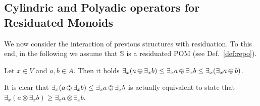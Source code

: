 \documentclass{llncs}
\def\monop{\otimes}
\def\odiv{\, {\ominus\hspace{-7.7pt} \div} \,}
\begin{document}


\subsection{Cylindric and Polyadic operators for Residuated Monoids}
\label{cyre}
We now consider 
the interaction of previous structures with residuation. 
%
To this end, in the following we assume that 
$\mathbb{S}$ is a residuated POM (see Def.~\ref{def:repo}).


\begin{lemma}
\label{divex}
Let $x \in V$ and $a, b \in A$.
Then it holds
         $\exists_x(a \odiv \exists_x b) \leq \exists_x a \odiv \exists_x b \leq
                                               \exists_x(\exists_x a \odiv b)$.
\end{lemma}



\begin{remark}
\label{remdiv}
It is clear that $\exists_x(a \odiv \exists_x b) \leq \exists_x a \odiv \exists_x b$
is actually equivalent to state that
$\exists_x(a \monop \exists_x b) \geq \exists_x a \monop \exists_x b$.
\end{remark}
\end{document}
